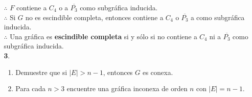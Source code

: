 \documentclass[12pt]{article}
\begin{document}
	$\therefore$ $F$ contiene a $C_4$ o a $\overline{P_3}$ como subgráfica inducida.\\

	$\therefore$ Si $G$ no es escindible completa, entonces contiene a $C_4$ o $\overline{P_3}$ a  como subgráfica inducida.\\
	
	$\therefore$ Una gráfica es \textbf{escindible completa} si y sólo si no contiene a $C_4$ ni a $\overline{P_3}$ como subgráfica inducida.\\
\vspace{1cm}
%
%
\textbf{3}.
\begin{enumerate}[label=\alph*)]

    \item Demuestre que si $\mid E \mid > n - 1$, entonces $G$ es conexa.
    \begin{tcolorbox}[title=\textbf{Hipotesis}, colback=red!15!white, colframe=black!]

    \end{tcolorbox}
    \begin{tcolorbox}[title=\textbf{Definiciones}, colback=blue!15!white, colframe=black!]
    
    \end{tcolorbox}

    \item Para cada $n > 3$ encuentre una gráfica inconexa de orden $n$ con $|E| = n - 1$.
    \begin{tcolorbox}[title=\textbf{Hipotesis}, colback=red!15!white, colframe=black!]

    \end{tcolorbox}
    \begin{tcolorbox}[title=\textbf{Definiciones}, colback=blue!15!white, colframe=black!]
    
    \end{tcolorbox}
\end{enumerate}
\end{document}
